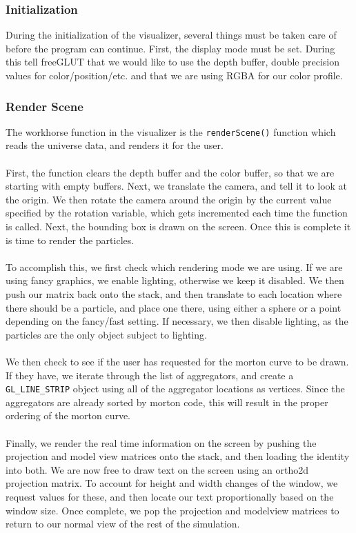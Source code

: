 \documentclass[fleqn,10pt]{UserGuideArx} %
\begin{document}
\subsubsection{Initialization}
    During the initialization of the visualizer, several things must be taken care of before the program can continue. First, the display mode must be set. During this tell freeGLUT that we would like to use the depth buffer, double precision values for color/position/etc. and that we are using RGBA for our color profile.\\

\subsubsection{Render Scene}
    The workhorse function in the visualizer is the \texttt{renderScene()} function which reads the universe data, and renders it for the user. \\~\\
    First, the function clears the depth buffer and the color buffer, so that we are starting with empty buffers. Next, we translate the camera, and tell it to look at the origin. We then rotate the camera around the origin by the current value specified by the rotation variable, which gets incremented each time the function is called. Next, the bounding box is drawn on the screen. Once this is complete it is time to render the particles. \\~\\
    To accomplish this, we first check which rendering mode we are using. If we are using fancy graphics, we enable lighting, otherwise we keep it disabled. We then push our matrix back onto the stack, and then translate to each location where there should be a particle, and place one there, using either a sphere or a point depending on the fancy/fast setting. If necessary, we then disable lighting, as the particles are the only object subject to lighting.\\~\\
    We then check to see if the user has requested for the morton curve to be drawn. If they have, we iterate through the list of aggregators, and create a \texttt{GL\_LINE\_STRIP} object using all of the aggregator locations as vertices. Since the aggregators are already sorted by morton code, this will result in the proper ordering of the morton curve.\\~\\
    Finally, we render the real time information on the screen by pushing the projection and model view matrices onto the stack, and then loading the identity into both. We are now free to draw text on the screen using an ortho2d projection matrix. To account for height and width changes of the window, we request values for these, and then locate our text proportionally based on the window size. Once complete, we pop the projection and modelview matrices to return to our normal view of the rest of the simulation.\\~\\
\end{document}
